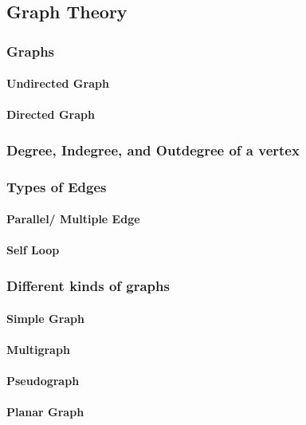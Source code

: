 \documentclass[11pt]{article}
\begin{document}
  \subsection{Graph Theory}

       \subsubsection{Graphs}
           \paragraph{Undirected Graph}
           \paragraph{Directed Graph}

       \subsubsection{Degree, Indegree, and Outdegree of a vertex}
 
       \subsubsection{Types of Edges}
           \paragraph{Parallel/ Multiple Edge}
           \paragraph{Self Loop}

       \subsubsection{Different kinds of graphs}
            \paragraph{Simple Graph}
            \paragraph{Multigraph}
            \paragraph{Pseudograph}
            \paragraph{Planar Graph}
\end{document}
